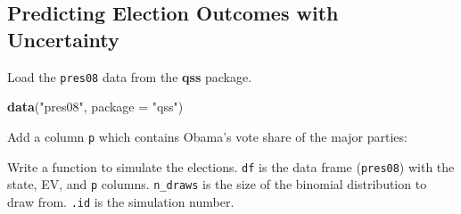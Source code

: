 \documentclass[]{book}
\newenvironment{Shaded}{\begin{snugshade}}{\end{snugshade}}
\newcommand{\CommentTok}[1]{\textcolor[rgb]{0.56,0.35,0.01}{\textit{#1}}}
\newcommand{\ControlFlowTok}[1]{\textcolor[rgb]{0.13,0.29,0.53}{\textbf{#1}}}
\newcommand{\DataTypeTok}[1]{\textcolor[rgb]{0.13,0.29,0.53}{#1}}
\newcommand{\DecValTok}[1]{\textcolor[rgb]{0.00,0.00,0.81}{#1}}
\newcommand{\KeywordTok}[1]{\textcolor[rgb]{0.13,0.29,0.53}{\textbf{#1}}}
\newcommand{\NormalTok}[1]{#1}
\newcommand{\OperatorTok}[1]{\textcolor[rgb]{0.81,0.36,0.00}{\textbf{#1}}}
\newcommand{\StringTok}[1]{\textcolor[rgb]{0.31,0.60,0.02}{#1}}
\theoremstyle{definition}
\theoremstyle{definition}
\theoremstyle{definition}
\theoremstyle{remark}
\begin{document}
\hypertarget{predicting-election-outcomes-with-uncertainty}{%
\subsection{Predicting Election Outcomes with
Uncertainty}\label{predicting-election-outcomes-with-uncertainty}}

Load the \texttt{pres08} data from the \textbf{qss} package.

\begin{Shaded}
\begin{Highlighting}[]
\KeywordTok{data}\NormalTok{(}\StringTok{"pres08"}\NormalTok{, }\DataTypeTok{package =} \StringTok{"qss"}\NormalTok{)}
\end{Highlighting}
\end{Shaded}

Add a column \texttt{p} which contains Obama's vote share of the major
parties:

\begin{Shaded}
\end{Shaded}

Write a function to simulate the elections. \texttt{df} is the data
frame (\texttt{pres08}) with the state, EV, and \texttt{p} columns.
\texttt{n\_draws} is the size of the binomial distribution to draw from.
\texttt{.id} is the simulation number.

\begin{Shaded}
\end{Shaded}
\end{document}
